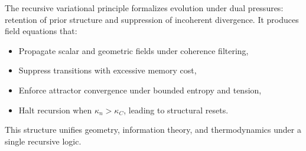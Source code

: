 The recursive variational principle formalizes evolution under dual pressures: retention of prior structure and suppression of incoherent divergence. It produces field equations that:
\begin{itemize}
    \item Propagate scalar and geometric fields under coherence filtering,
    \item Suppress transitions with excessive memory cost,
    \item Enforce attractor convergence under bounded entropy and tension,
    \item Halt recursion when \( \kappa_n > \kappa_C \), leading to structural resets.
\end{itemize}

This structure unifies geometry, information theory, and thermodynamics under a single recursive logic.

